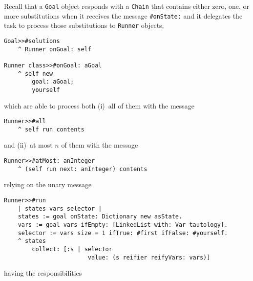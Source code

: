 \documentclass[a4paper,12pt]{article}
\begin{document}
Recall that a \Verb|Goal| object responds with a \Verb|Chain| that contains either zero,
one, or more substitutions when it receives the message \Verb|#onState:| and it
delegates the task to process those substitutions to \Verb|Runner| objects,
\begin{verbatim}
Goal>>#solutions
    ^ Runner onGoal: self

Runner class>>#onGoal: aGoal
    ^ self new
        goal: aGoal;
        yourself
\end{verbatim}
which are able to process both (i)~all of them with the message
\begin{verbatim}
Runner>>#all
    ^ self run contents
\end{verbatim}
and (ii)~at most $n$ of them with the message
\begin{verbatim}
Runner>>#atMost: anInteger
    ^ (self run next: anInteger) contents
\end{verbatim}
relying on the unary message
\begin{verbatim}
Runner>>#run
    | states vars selector |
    states := goal onState: Dictionary new asState.
    vars := goal vars ifEmpty: [LinkedList with: Var tautology].
    selector := vars size = 1 ifTrue: #first ifFalse: #yourself.
    ^ states
        collect: [:s | selector
                        value: (s reifier reifyVars: vars)]
\end{verbatim}
having the responsibilities
\end{document}
